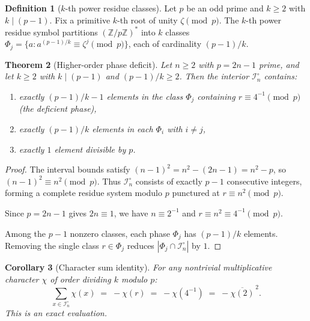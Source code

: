 \documentclass[11pt, a4paper]{article}
\newtheorem{theorem}{Theorem}[section]
\newtheorem{corollary}[theorem]{Corollary}
\theoremstyle{definition}
\newtheorem{definition}[theorem]{Definition}
\theoremstyle{remark}
\begin{document}
\begin{definition}[$k$-th power residue classes]
\label{def:classes}
Let $p$ be an odd prime and $k \ge 2$ with $k \mid (p-1)$.
Fix a primitive $k$-th root of unity $\zeta \pmod{p}$.
The $k$-th power residue symbol partitions
$(\mathbb{Z}/p\mathbb{Z})^*$ into $k$ classes
$\Phi_j = \{a : a^{(p-1)/k} \equiv \zeta^j \pmod{p}\}$,
each of cardinality $(p-1)/k$.
\end{definition}

\begin{theorem}[Higher-order phase deficit]
\label{thm:main}
Let $n \ge 2$ with $p = 2n - 1$ prime, and let $k \ge 2$
with $k \mid (p-1)$ and $(p-1)/k \ge 2$.
Then the interior $\mathcal{I}_n^\circ$ contains:
\begin{enumerate}[nosep, label=(\roman*)]
\item exactly $(p-1)/k - 1$ elements in the class $\Phi_j$
containing $r \equiv 4^{-1} \pmod{p}$
\textup{(}the deficient phase\textup{)},
\item exactly $(p-1)/k$ elements in each $\Phi_i$
with $i \ne j$,
\item exactly $1$ element divisible by $p$.
\end{enumerate}
\end{theorem}

\begin{proof}
The interval bounds satisfy
$(n-1)^2 = n^2 - (2n - 1) = n^2 - p$,
so $(n-1)^2 \equiv n^2 \pmod{p}$.
Thus $\mathcal{I}_n^\circ$ consists of exactly
$p - 1$ consecutive integers, forming a complete
residue system modulo $p$ punctured at
$r \equiv n^2 \pmod{p}$.

Since $p = 2n - 1$ gives $2n \equiv 1$, we have
$n \equiv 2^{-1}$ and
$r \equiv n^2 \equiv 4^{-1} \pmod{p}$.

Among the $p - 1$ nonzero classes, each phase $\Phi_j$
has $(p-1)/k$ elements.
Removing the single class $r \in \Phi_j$ reduces
$|\Phi_j \cap \mathcal{I}_n^\circ|$ by $1$.
\end{proof}

\begin{corollary}[Character sum identity]
\label{cor:charsum}
For any nontrivial multiplicative character $\chi$
of order dividing $k$ modulo $p$:
\begin{equation}\label{eq:charsum}
    \sum_{x \in \mathcal{I}_n^\circ} \chi(x)
    \;=\; -\chi(r)
    \;=\; -\chi(4^{-1})
    \;=\; -\overline{\chi(2)}^{\,2}.
\end{equation}
This is an exact evaluation.
\end{corollary}
\end{document}
